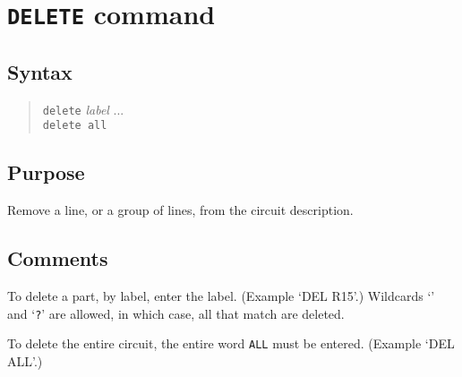 %
%
%
%
\section{{\tt DELETE} command}
\subsection{Syntax}
\begin{verse}
{\tt delete} {\it label} ...\\
{\tt delete all}
\end{verse}
\subsection{Purpose}

Remove a line, or a group of lines, from the circuit description.
\subsection{Comments}

To delete a part, by label, enter the label.  (Example `DEL R15'.)
Wildcards `{\tt *}' and `{\tt ?}' are allowed, in which case, all that match
are deleted.

To delete the entire circuit, the entire word {\tt ALL} must be entered.
(Example `DEL ALL'.)

